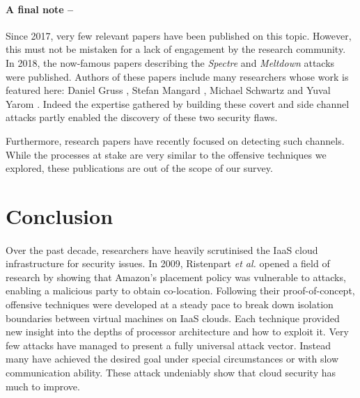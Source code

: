 \documentclass[orivec,envcountsame, a4paper, 11pt]{llncs}
\begin{document}
\paragraph{A final note --} Since 2017, very few relevant papers have been published on this topic. However, this must not be mistaken for a lack of engagement by the research community. In 2018, the now-famous papers describing the \textit{Spectre} \cite{spectre} and \textit{Meltdown} \cite{meltdown} attacks were published. Authors of these papers include many researchers whose work is featured here: Daniel Gruss \cite{Gruss2016,Maurice2017,Pessl2016}, Stefan Mangard \cite{Gruss2016,Maurice2017,Pessl2016},  Michael Schwartz \cite{Maurice2017,Pessl2016} and Yuval Yarom \cite{Liu2015,Yarom2014}. Indeed the expertise gathered by building these covert and side channel attacks partly enabled the discovery of these two security flaws.

Furthermore, research papers have recently focused on detecting such channels. While the processes at stake are very similar to the offensive techniques we explored, these publications are out of the scope of our survey. 



\section*{Conclusion}
\label{sec:conclusion}

\begin{comment}
	- Summarise what happened in this field. From birth with Ristenpart2009 to more recent SSH between two VMs.
	- What are the achievements and limitations?
	- Where do we go next?
\end{comment}

\paragraph{} Over the past decade, researchers have heavily scrutinised the IaaS cloud infrastructure for security issues. In 2009, Ristenpart \textit{et al.} \cite{Ristenpart2009} opened a field of research by showing that Amazon's placement policy was vulnerable to attacks, enabling a malicious party to obtain co-location. Following their proof-of-concept, offensive techniques were developed at a steady pace to break down isolation boundaries between virtual machines on IaaS clouds. Each technique provided new insight into the depths of processor architecture and how to exploit it. Very few attacks have managed to present a fully universal attack vector. Instead many have achieved the desired goal under special circumstances or with slow communication ability. These attack undeniably show that cloud security has much to improve.
\end{document}
